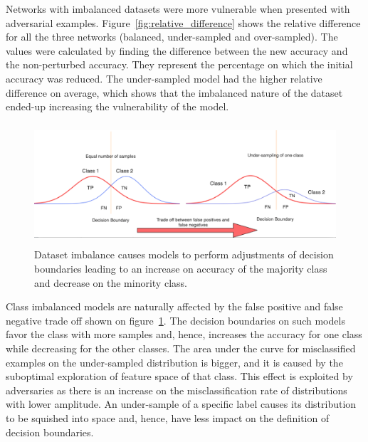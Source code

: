 \documentclass[runningheads,a4paper]{llncs}
\begin{document}
Networks with imbalanced datasets were more vulnerable when presented with adversarial examples. Figure~\ref{fig:relative_difference} shows the relative difference for all the three networks (balanced, under-sampled and over-sampled).  The values were calculated by finding the difference between the new accuracy and the non-perturbed accuracy. They represent the percentage on which the initial accuracy was reduced. The under-sampled model had the higher relative difference on average, which shows that the imbalanced nature of the dataset ended-up increasing the vulnerability of the model.
\begin{figure}
	\centering
	\includegraphics[height=4.5cm]{class_dist.png}
	\caption{Dataset imbalance causes models to perform adjustments of decision boundaries leading to an increase on accuracy of the majority class and decrease on the minority class.}
	\label{fig:class_dist}
\end{figure}

Class imbalanced models are naturally affected by the false positive and false negative trade off shown on figure~\ref{fig:class_dist}. The decision boundaries on such models favor the class with more samples and, hence, increases the accuracy for one class while decreasing for the other classes. The area under the curve for misclassified examples on the under-sampled distribution is bigger, and it is caused by the suboptimal exploration of feature space of that class. This effect is exploited by adversaries as there is an increase on the misclassification rate of distributions with lower amplitude. An under-sample of a specific label causes its distribution to be squished into space and, hence, have less impact on the definition of decision boundaries.
\end{document}

